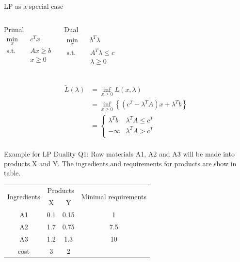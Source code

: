 \documentclass[12pt,notes,mathserif]{beamer}
\begin{document}
\begin{frame}
	{LP as a special case} 
	\begin{columns}
		\begin{block}{Primal}
			\begin{equation}
				\begin{aligned}
					\min_x \quad & c^T x \\
					\textrm{s.t.} \quad & Ax \ge b \\
					& x \ge 0 \\ 
				\end{aligned}
			\end{equation}
		\end{block}
		\pause
		\begin{block}{Dual}
			\begin{equation}
				\begin{aligned}
					\min_x \quad & b^T \lambda \\
					\textrm{s.t.} \quad & A^T \lambda \le c \\
					& \lambda \ge 0 \\ 
				\end{aligned}
			\end{equation}
		\end{block}
	\end{columns}
	\begin{equation*}
		\begin{aligned}
			\tilde{L}(\lambda) & = \inf_{x \ge 0 } L(x, \lambda) \\
									 & = \inf_{x \ge 0 } \left\{ (c^T - \lambda^T A ) x + \lambda ^T b  \right\}     \\ 
									 & = \begin{cases} 
										\lambda^T b  & \lambda^T A \le c^T \\
										-\infty &  \lambda^T A > c^T  \\
									\end{cases}  \\
		\end{aligned}
	\end{equation*}
\end{frame}

\begin{frame}
	{Example for LP Duality} 
	Q1: Raw materials A1, A2 and A3 will be made into products X and Y. The ingredients and requirements for products are show in table. 
	\begin{table}
\begin{tabular}{cccc}
	\hline
	\multirow{2}{*}{Ingredients} & \multicolumn{2}{c}{Products} & \multirow{2}{*}{Minimal requirements}  \\ \cline{2-3}
	     & X   & Y    &     \\  \hline \hline
	A1   & 0.1 & 0.15 & 1   \\
	A2   & 1.7 & 0.75 & 7.5 \\
	A3   & 1.2 & 1.3  & 10  \\ \hline
	cost & 3   & 2    &     \\ \hline
\end{tabular}
\end{table}

\end{frame}
\end{document}
